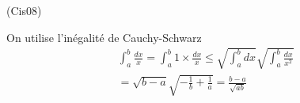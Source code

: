 \begin{tiny}(Cis08)\end{tiny} On utilise l'inégalité de Cauchy-Schwarz
\begin{multline*}
  \int_a^b\frac{dx}{x} = \int_a^b1\times \frac{dx}{x}
\leq \sqrt{\int_a^b dx}\sqrt{\int_a^b\frac{dx}{x^2}}\\
= \sqrt{b-a}\sqrt{-\frac{1}{b}+\frac{1}{a}}
= \frac{b-a}{\sqrt{ab}}
\end{multline*}
